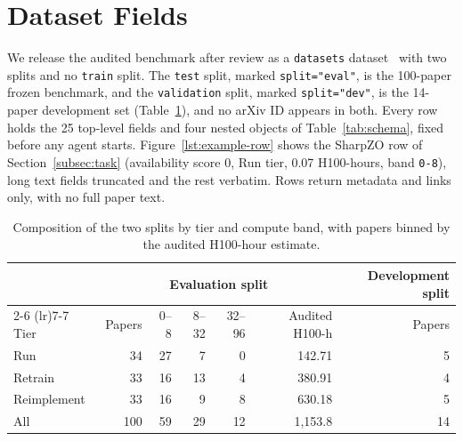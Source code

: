 \clearpage  %
\section{Dataset Fields}
\label{app:dataset-schema}

We release the audited benchmark after review as a \texttt{datasets}
dataset~\citep{lhoest2021datasets} with two splits and no \texttt{train}
split. The \texttt{test} split, marked \texttt{split="eval"}, is the 100-paper
frozen benchmark, and the \texttt{validation} split, marked \texttt{split="dev"},
is the 14-paper development set (Table~\ref{tab:splits}), and no arXiv ID
appears in both. Every row holds the 25 top-level fields and four nested objects of
Table~\ref{tab:schema}, fixed before any agent starts. Figure~\ref{lst:example-row} shows the SharpZO row of
Section~\ref{subsec:task} (availability score 0, Run tier, 0.07 H100-hours, band
\texttt{0-8}), long text fields truncated and the rest verbatim. Rows return
metadata and links only, with no full paper text.

\begin{table}[ht]
\centering
\small
\begin{tabular}{@{}lrrrrrr@{}}
\toprule
& \multicolumn{5}{c}{Evaluation split} & Development split \\
\cmidrule(lr){2-6} \cmidrule(lr){7-7}
Tier & Papers & 0--8 & 8--32 & 32--96 & Audited H100-h & Papers \\
\midrule
Run         & 34  & 27 & 7  & 0  & 142.71    & 5  \\
Retrain     & 33  & 16 & 13 & 4  & 380.91    & 4  \\
Reimplement & 33  & 16 & 9  & 8  & 630.18    & 5  \\
\midrule
All         & 100 & 59 & 29 & 12 & 1{,}153.8 & 14 \\
\bottomrule
\end{tabular}
\caption{Composition of the two splits by tier and compute band, with papers
binned by the audited H100-hour estimate.}
\label{tab:splits}
\end{table}

